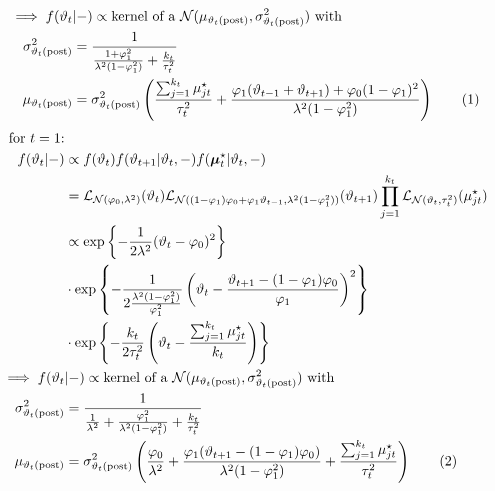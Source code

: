 \documentclass[12pt,	%
	a4paper,		%
	twoside,		%
	openright,		%
	titlepage,%
	]{book}
\theoremstyle{definition}
\begin{document}
\begin{itemize}
\begin{align*}
    \implies f(\theta_t&|-)\propto \text{kernel of a $\N(\mu_{\postp{\theta_t}},\sigma^2_{\postp{\theta_t}})$ with}\\
    \sigma^2_{\postp{\theta_t}}&=\dfrac{1}{\frac{1+\phi_1^2}{\lambda^2(1-\phi_1^2)}+\frac{k_t}{\tau^2_t}}\\
\mu_{\postp{\theta_t}}&=\sigma^2_{\postp{\theta_t}}\left(\frac{\sum_{j=1}^{k_t}\mu^\star_{jt}}{\tau^2_t} + \frac{\phi_1(\theta_{t-1}+\theta_{t+1}) + \phi_0(1-\phi_1)^2}{\lambda^2(1-\phi_1^2)} \right)
    \tag{\stepcounter{equation}\theequation}
\end{align*}
\begin{align*}
    \text{for $t=1$:}&\\
    f(\theta_t|-) &\propto f(\theta_t)f(\theta_{t+1}|\theta_t,-)f(\vec{\mu}^\star_t|\theta_t,-)\\
    &=\law_{\N(\phi_0,\lambda^2)}(\theta_t) \law_{\N((1-\phi_1)\phi_0 + \phi_1\theta_{t-1},\lambda^2(1-\phi_1^2))}(\theta_{t+1})\prod_{j=1}^{k_t} \law_{\N(\theta_t,\tau^2_t)}(\mu^\star_{jt})\\
    &\propto\expp{-\frac{1}{2\lambda^2}(\theta_t-\phi_0)^2}\\&\cdot\expp{-\frac{1}{2\frac{\lambda^2(1-\phi_1^2)}{\phi_1^2}}\left(\theta_t - \frac{\theta_{t+1}-(1-\phi_1)\phi_0}{\phi_1}\right)^2}\\&\cdot \expp{-\frac{k_t}{2\tau^2_t}\left(\theta_t - \frac{\sum_{j=1}^{k_t}\mu^\star_{jt}}{k_t}\right)}\\
    \implies f(\theta_t&|-)\propto \text{kernel of a $\N(\mu_{\postp{\theta_t}},\sigma^2_{\postp{\theta_t}})$ with}\\
    \sigma^2_{\postp{\theta_t}}&=\dfrac{1}{\frac{1}{\lambda^2}+\frac{\phi_1^2}{\lambda^2(1-\phi_1^2)}+\frac{k_t}{\tau^2_t}}\\
\mu_{\postp{\theta_t}}&=\sigma^2_{\postp{\theta_t}}\left(\frac{\phi_0}{\lambda^2}+\frac{\phi_1(\theta_{t+1}-(1-\phi_1)\phi_0)}{\lambda^2(1-\phi_1^2)}+\frac{\sum_{j=1}^{k_t}\mu^\star_{jt}}{\tau^2_t} \right)
\tag{\stepcounter{equation}\theequation}
\end{align*}



\end{itemize}
\end{document}
